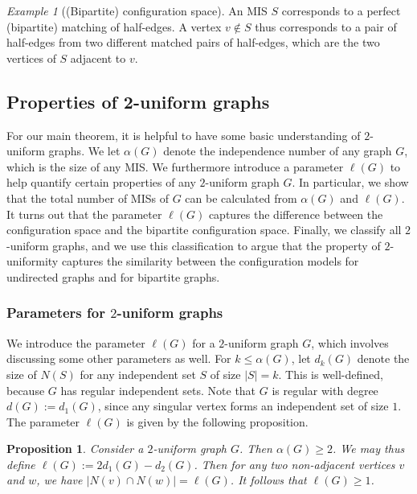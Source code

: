 \documentclass{article}
\theoremstyle{plain}
\theoremstyle{remark}
\newtheorem{example}[theorem]{Example}
\theoremstyle{plain}
\newtheorem{proposition}[theorem]{Proposition}
\numberwithin{equation}{section}
\begin{document}
	\begin{example}[(Bipartite) configuration space]
		An MIS $S$ corresponds to a perfect (bipartite) matching of half-edges. A vertex $v\notin S$ thus corresponds to a pair of half-edges from two different matched pairs of half-edges, which are the two vertices of $S$ adjacent to $v$.
	\end{example}
	
	\subsection{Properties of 2-uniform graphs}\label{subsection_independent_properties}
	
	For our main theorem, it is helpful to have some basic understanding of $2$-uniform graphs. We let $\alpha(G)$ denote the independence number of any graph $G$, which is the size of any MIS. We furthermore introduce a parameter $\ell(G)$ to help quantify certain properties of any $2$-uniform graph $G$. In particular, we show that the total number of MISs of $G$ can be calculated from $\alpha(G)$ and $\ell(G)$. It turns out that the parameter $\ell(G)$ captures the difference between the configuration space and the bipartite configuration space. Finally, we classify all $2$-uniform graphs, and we use this classification to argue that the property of $2$-uniformity captures the similarity between the configuration models for undirected graphs and for bipartite graphs.
	
	\subsubsection{Parameters for $2$-uniform graphs}\label{subsection_independent_parameter}
	
	We introduce the parameter $\ell(G)$ for a $2$-uniform graph $G$, which involves discussing some other parameters as well. For $k\leq\alpha(G)$, let $d_k(G)$ denote the size of $N(S)$ for any independent set $S$ of size $|S|=k$. This is well-defined, because $G$ has regular independent sets. Note that $G$ is regular with degree $d(G):=d_1(G)$, since any singular vertex forms an independent set of size $1$. The parameter $\ell(G)$ is given by the following proposition.
	
	\begin{proposition}\label{proposition_ell}
		Consider a $2$-uniform graph $G$. Then $\alpha(G)\geq2$. We may thus define $\ell(G):=2d_1(G)-d_2(G)$. Then for any two non-adjacent vertices $v$ and $w$, we have $|N(v)\cap N(w)|=\ell(G)$. It follows that $\ell(G)\geq1$.
	\end{proposition}
	
\end{document}
